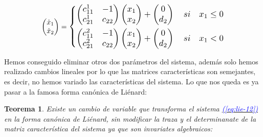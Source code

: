 \documentclass[12pt,a4paper]{report} %
\newtheorem{theorem}{Teorema}[chapter]
\newcommand{\eref}[1]{\hyperref[#1]{\textcolor{blue}{\textit{(\ref*{#1})}}}}
\begin{document}
	\begin{equation}
		\begin{pmatrix*}[r]
			\dot{x}_1 \\ \dot{x}_2
		\end{pmatrix*}=
		\label{eq:lie-12}
		\scalebox{1.2}{$\displaystyle
			\left\{
			\begin{aligned}
				\begin{pmatrix*}[r]
					c_{11}^1 & -1 \\
					c_{21}^1 & c_{22}
				\end{pmatrix*}\begin{pmatrix*}[r]
				x_1\\x_2
				\end{pmatrix*}+\begin{pmatrix*}[c]
				0 \\ d_2
				\end{pmatrix*} \quad si \quad x_1 \leq 0 \\
				\begin{pmatrix*}[r]
					c_{11}^2 & -1 \\
					c_{21}^2 & c_{22}
				\end{pmatrix*}\begin{pmatrix*}[r]
				x_1\\x_2
				\end{pmatrix*}+\begin{pmatrix*}[c]
				0 \\ d_2
				\end{pmatrix*} \quad si \quad x_1 < 0
			\end{aligned}
			\right.
			$} 
	\end{equation}\smallskip
	
	Hemos conseguido eliminar otros dos parámetros del sistema, además solo hemos realizado cambios lineales por lo que las matrices características son semejantes, es decir, no hemos variado las características del sistema. Lo que nos queda es ya pasar a la famosa forma canónica de Liénard:
	
	
	\begin{theorem}\label{t2}
		Existe un cambio de variable que transforma el sistema \eref{eq:lie-12} en la forma canónica de Liénard, sin modificar la traza y el determinanate de la matriz característica del sistema ya que son invariates algebraicos:
	\end{theorem}
	
\end{document}
